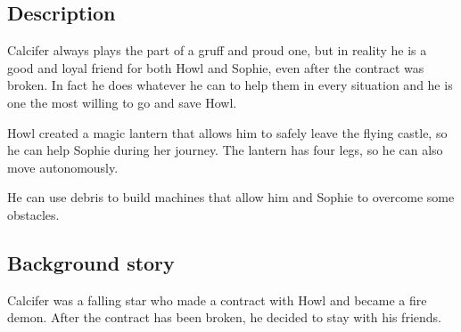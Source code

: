 \subsection{Description}
Calcifer always plays the part of a gruff and proud one, but in reality he is a good and loyal friend for both Howl and Sophie, even after the contract was broken. In fact he does whatever he can to help them in every situation and he is one the most willing to go and save Howl.

Howl created a magic lantern that allows him to safely leave the flying castle, so he can help Sophie during her journey. The lantern has four legs, so he can also move autonomously.

He can use debris to build machines that allow him and Sophie to overcome some obstacles.

\subsection{Background story}
Calcifer was a falling star who made a contract with Howl and became a fire demon. After the contract has been broken, he decided to stay with his friends.
